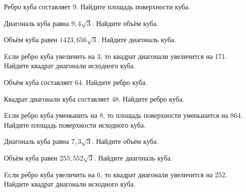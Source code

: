 \begin{taskBN}{37}
Ребро куба составляет 9. Найдите площадь поверхности куба.
\end{taskBN}

\begin{taskBN}{38}
Диагональ куба равна $9,4\sqrt{3}$. Найдите объём куба.
\end{taskBN}

\begin{taskBN}{39}
Объём куба равен $1423,656\sqrt{3}$. Найдите диагональ куба.
\end{taskBN}

\begin{taskBN}{40}
Eсли ребро куба увеличить на 3, то квадрат диагонали увеличится на 171. Найдите квадрат диагонали исходного куба.
\end{taskBN}

\begin{taskBN}{41}
Объём куба составляет 64. Найдите ребро куба.
\end{taskBN}

\begin{taskBN}{42}
Квадрат диагонали куба составляет 48. Найдите ребро куба.
\end{taskBN}

\begin{taskBN}{43}
Eсли ребро куба уменьшить на 8, то площадь поверхности уменьшится на 864. Найдите площадь поверхности исходного куба.
\end{taskBN}

\begin{taskBN}{44}
Диагональ куба равна $7,3\sqrt{3}$. Найдите объём куба.
\end{taskBN}

\begin{taskBN}{45}
Объём куба равен $255,552\sqrt{3}$. Найдите диагональ куба.
\end{taskBN}

\begin{taskBN}{46}
Eсли ребро куба увеличить на 6, то квадрат диагонали увеличится на 252. Найдите квадрат диагонали исходного куба.
\end{taskBN}

